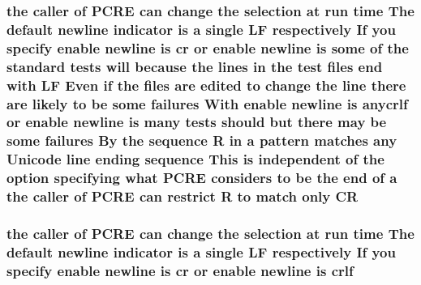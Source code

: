 \subsubsection[{\texorpdfstring{CR}{CR}}]{\setlength{\rightskip}{0pt plus 5cm}the caller {\bf of} {\bf P\+C\+RE} {\bf can} change the selection at {\bf run} {\bf time} The {\bf default} {\bf newline} indicator {\bf is} {\bf a} single {\bf LF} {\bf respectively} If you specify enable {\bf newline} {\bf is} {\bf cr} {\bf or} enable {\bf newline} {\bf is} some {\bf of} the standard {\bf tests} will because the {\bf lines} {\bf in} the test {\bf files} {\bf end} {\bf with} {\bf LF} Even {\bf if} the {\bf files} {\bf are} edited {\bf to} change the {\bf line} there {\bf are} likely {\bf to} {\bf be} some failures With enable {\bf newline} {\bf is} anycrlf {\bf or} enable {\bf newline} {\bf is} many {\bf tests} should but there may {\bf be} some failures By the {\bf sequence} {\bf R} {\bf in} {\bf a} {\bf pattern} {\bf matches} {\bf any} {\bf Unicode} {\bf line} ending {\bf sequence} This {\bf is} independent {\bf of} the {\bf option} {\bf specifying} {\bf what} {\bf P\+C\+RE} considers {\bf to} {\bf be} the {\bf end} {\bf of} {\bf a} the caller {\bf of} {\bf P\+C\+RE} {\bf can} restrict {\bf R} {\bf to} {\bf match} only CR}\hypertarget{README_8txt_abda14f14adb8483ae6efc026366fb940}{}\label{README_8txt_abda14f14adb8483ae6efc026366fb940}
\subsubsection[{\texorpdfstring{crlf}{crlf}}]{\setlength{\rightskip}{0pt plus 5cm}the caller {\bf of} {\bf P\+C\+RE} {\bf can} change the selection at {\bf run} {\bf time} The {\bf default} {\bf newline} indicator {\bf is} {\bf a} single {\bf LF} {\bf respectively} If you specify enable {\bf newline} {\bf is} {\bf cr} {\bf or} enable {\bf newline} {\bf is} crlf}\hypertarget{README_8txt_a65d6c85414a6369c5bfc54f6ec0be1e1}{}\label{README_8txt_a65d6c85414a6369c5bfc54f6ec0be1e1}
